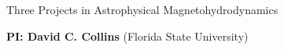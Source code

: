 \documentclass[11pt]{NSF}  %
\begin{document}
\begin{centering}
\begin{LARGE}
    Three Projects in Astrophysical Magnetohydrodynamics
\end{LARGE}


\vspace{2mm}
{\bf PI: David C. Collins} (Florida State University)

\end{centering}
\pagestyle{plain}

%
%
%



%



\end{document}
